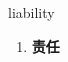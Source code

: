 
\begin{frame}
{\huge liability}
\begin{center}
\begin{enumerate}\Large
  \item \textbf{责任}
\end{enumerate}
\end{center}
\end{frame}
